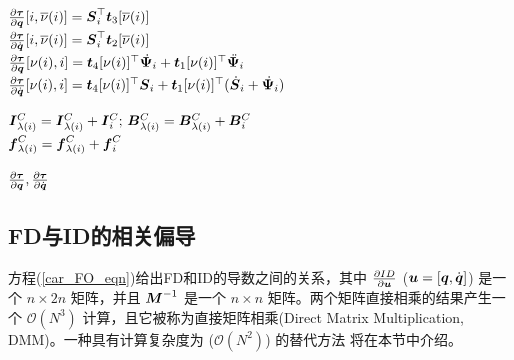 \documentclass[letterpaper, 10 pt, conference]{ieeetran}  %
\begin{document}
\begin{algorithm}[t]
\begin{algorithmic}[1]
\STATE $\frac{\partial \boldsymbol\tau}{\partial \boldsymbol{q}}[i, \overline{\nu}(i)] = \boldsymbol{S}_i^\top \boldsymbol{t}_3[\overline{\nu}(i)]$ \\[1ex]

\STATE $\frac{\partial \boldsymbol\tau}{\partial \dot{\boldsymbol{q}}}[i, \overline{\nu}(i)] = \boldsymbol{S}_i^\top \boldsymbol{t}_2[\overline{\nu}(i)]$ \\[1ex]


\STATE $\frac{\partial \boldsymbol\tau}{\partial \boldsymbol{q}}[\nu(i), i] =\boldsymbol{t}_4[\nu(i)]^\top \,\dot{\!\boldsymbol{\Psi}}_i +  \boldsymbol{t}_1[\nu(i)]^\top \,\ddot{\!\boldsymbol{\Psi}}_i $ \\[1ex]


\STATE $\frac{\partial \boldsymbol\tau}{\partial \dot{\boldsymbol{q}}}[ \nu(i), i] = \boldsymbol{t}_4[\nu(i)]^\top \boldsymbol{S}_i + \boldsymbol{t}_1[\nu(i)]^\top (\,\dot{\!\boldsymbol{S}}_i + \,\dot{\!\boldsymbol{\Psi}}_i) $ \\[1ex]


    
        \STATE $\boldsymbol{I}{}_{\lambda(i)}^C = \boldsymbol{I}{}_{\lambda(i)}^C + \boldsymbol{I}{}_i^C ; \, \boldsymbol{B}{}_{\lambda(i)}^C = \boldsymbol{B}{}_{\lambda(i)}^C +  \boldsymbol{B}{}_i^C $ \\[.5ex]
        \STATE $ \boldsymbol{f}_{\lambda(i)}^C = \boldsymbol{f}_{\lambda(i)}^C +  \boldsymbol{f}_i^C $ 

    \ENDIF

\ENDFOR
\RETURN $\frac{\partial \boldsymbol{\tau} }{\partial{\boldsymbol{q}}},\frac{\partial \boldsymbol{\tau} }{\partial{\dot{\boldsymbol{q}}}}$

\end{algorithmic}

\label{alg:tau_FO_v2}
\end{algorithm}




\subsection{FD与ID的相关偏导}
\label{sec:efficient_SVA}

方程(\ref{car_FO_eqn})给出FD和ID的导数之间的关系，其中 $\frac{\partial ID }{\partial \boldsymbol{u}}$ ($\boldsymbol{u} = [\boldsymbol{q}, \dot{\boldsymbol{q}} ]$) 是一个 $n \times 2n$ 矩阵，并且 $\boldsymbol{M}^{-1}$ 是一个 $n \times n$ 矩阵。两个矩阵直接相乘的结果产生一个 $\mathcal{O}(N^3)$ 计算，且它被称为直接矩阵相乘(Direct Matrix Multiplication, DMM)。一种具有计算复杂度为 ($\mathcal{O}(N^2)$) 的替代方法 
将在本节中介绍。
\end{document}
